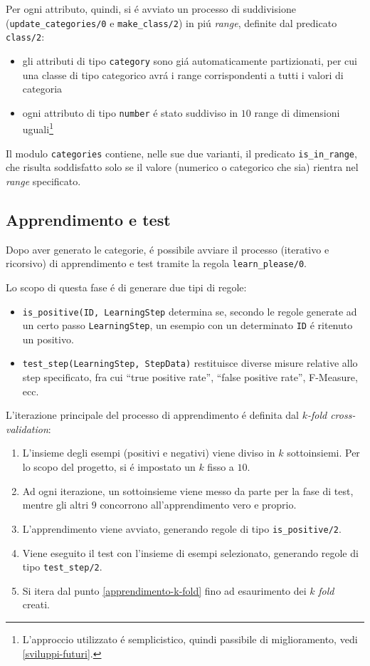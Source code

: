 \documentclass[preprint]{acm_proc_article-sp}
\begin{document}
Per ogni attributo, quindi, si \'e avviato un processo di suddivisione (\verb|update_categories/0| e \verb|make_class/2|) in pi\'u \textit{range}, definite dal predicato \verb|class/2|:
\begin{itemize}
\item gli attributi di tipo \verb|category| sono gi\'a automaticamente partizionati, per cui una classe di tipo categorico avr\'a i range corrispondenti a tutti i valori di categoria
\item ogni attributo di tipo \verb|number| \'e stato suddiviso in $10$ range di dimensioni uguali\footnote{L'approccio utilizzato \'e semplicistico, quindi passibile di miglioramento, vedi \ref{sviluppi-futuri}.}
\end{itemize}

Il modulo \verb|categories| contiene, nelle sue due varianti, il predicato \verb|is_in_range|, che risulta soddisfatto solo se il valore (numerico o categorico che sia) rientra nel \textit{range} specificato.

\subsection{Apprendimento e test}
\label{prolog-learner}
Dopo aver generato le categorie, \'e possibile avviare il processo (iterativo e ricorsivo) di apprendimento e test tramite la regola \verb|learn_please/0|.

Lo scopo di questa fase \'e di generare due tipi di regole:
\begin{itemize}
\item \verb|is_positive(ID, LearningStep| determina se, secondo le regole generate ad un certo passo \verb|LearningStep|, un esempio con un determinato \verb|ID| \'e ritenuto un positivo.
\item \verb|test_step(LearningStep, StepData)| restituisce diverse misure relative allo step specificato, fra cui ``true positive rate'', ``false positive rate'', F-Measure, ecc.
\end{itemize}

L'iterazione principale del processo di apprendimento \'e definita dal $k$\textit{-fold cross-validation}:
\begin{enumerate}
\item L'insieme degli esempi (positivi e negativi) viene diviso in $k$ sottoinsiemi. Per lo scopo del progetto, si \'e impostato un $k$ fisso a $10$.
\item\label{apprendimento-k-fold} Ad ogni iterazione, un sottoinsieme viene messo da parte per la fase di test, mentre gli altri $9$ concorrono all'apprendimento vero e proprio.
\item L'apprendimento viene avviato, generando regole di tipo \verb|is_positive/2|.
\item Viene eseguito il test con l'insieme di esempi selezionato, generando regole di tipo \verb|test_step/2|.
\item Si itera dal punto \ref{apprendimento-k-fold} fino ad esaurimento dei $k$ \textit{fold} creati.
\end{enumerate}
\end{document}

